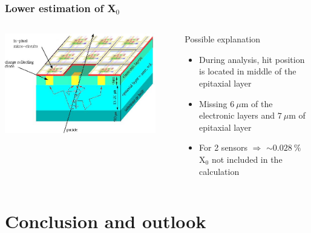 \documentclass{beamer}
\begin{document}
  \begin{frame}
    \frametitle{Lower estimation of X$_0$}

    \begin{columns}[c]
      \begin{column}{5cm}
        \begin{center}
          \includegraphics[width = 0.9\textwidth]{Pictures/principeMapsMIP.jpg}
        \end{center}
      \end{column}
      
      \begin{column}{5cm}
        \begin{block}{Possible explanation}
          \begin{itemize}
            \item During analysis, hit position is located in middle of the epitaxial layer
            \item Missing $6~\mu$m of the electronic layers and $7~\mu$m of epitaxial layer
            \item For 2 sensors $\Rightarrow$ $ \sim 0.028~\%$ X$_0$ not included in the calculation
          \end{itemize}
        \end{block}
      \end{column}
    \end{columns}

  \end{frame}

    
\section{Conclusion and outlook} 
\end{document}
